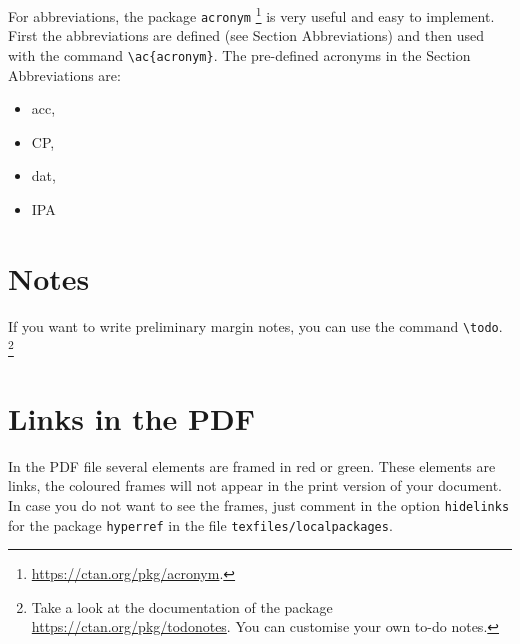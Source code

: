 For abbreviations, the package \texttt{acronym}%
%
\footnote{\url{https://ctan.org/pkg/acronym}.} %
%
is very useful and easy to implement. First the abbreviations are defined (see Section Abbreviations) and then used with the command \verb|\ac{acronym}|.  The pre-defined acronyms in the Section Abbreviations are: 

\begin{itemize}
\item \ac{acc}, 
\item \ac{CP}, 
\item \ac{dat},  
\item \ac{IPA} 
\end{itemize}


\section{Notes}
\label{ch:Notes}


If you want to write preliminary margin notes,  you can use the command \verb|\todo|.%
	\footnote{Take a look at the documentation of the package \url{https://ctan.org/pkg/todonotes}. You can customise your own to-do notes.} %

\section{Links in the PDF}

In the PDF file several elements are framed in red or green. These elements are links, the coloured frames will not appear in the print version of your document. In case you do not want to see the frames, just comment in the option \texttt{hidelinks} for the package \texttt{hyperref} in the file \texttt{texfiles/localpackages}.
